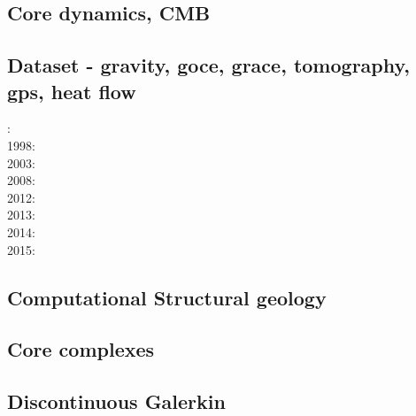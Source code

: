 \subsection*{Core dynamics, CMB}

\cite{hayu96}
\cite{lahb08}

\subsection*{Dataset - gravity, goce, grace, tomography, gps, heat flow}

: \cite{dzan81}\\
1998: \cite{bisp98}\\
2003: \cite{krhh03}\cite{sosi03}\\
2008: \cite{zhou08}\\
2012: \cite{hawj12}\cite{resa12}\cite{hawj12}\\
2013: \cite{ress13}\cite{ebbf13}\cite{davi13}\\
2014: \cite{paml14}\cite{ebbf14}\cite{krbk14}\\
2015: \cite{boem15}

\subsection*{Computational Structural geology}

\cite{acgf00}
\cite{trla00}

\subsection*{Core complexes}

\cite{lehm12}

\subsection*{Discontinuous Galerkin}

\cite{kauf12}\cite{ngpc10}\cite{coks09}\cite{fewk17}\cite{kans08}\cite{geor11}
\cite{cogo09}\cite{cacp02}\cite{cacs05}\cite{coks05}\cite{coks02}\cite{coks00}
\cite{mofh08}\cite{iglo17}\cite{ngpe12}\cite{puth18}\cite{hepb17}\cite{ngpc11}
\cite{conp10}\cite{mofp10}\cite{lelk15} 

